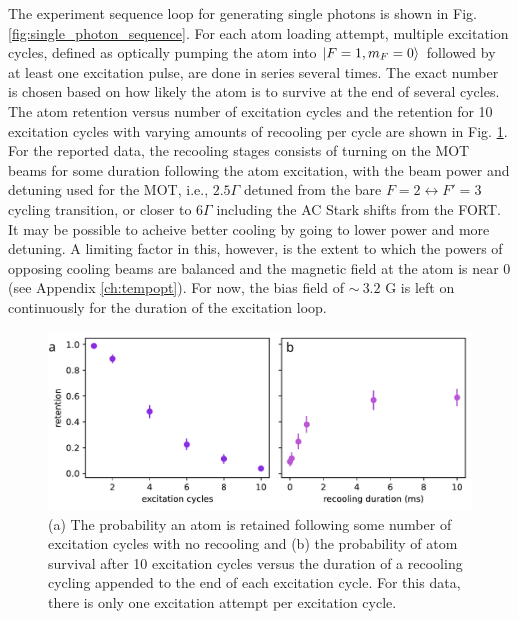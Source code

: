 The experiment sequence loop for generating single photons is shown in Fig. \ref{fig:single_photon_sequence}. For each atom loading attempt, multiple excitation cycles, defined as optically pumping the atom into $\ket{F=1,m_F=0}$ followed by at least one excitation pulse, are done in series several times. The exact number is chosen based on how likely the atom is to survive at the end of several cycles. The atom retention versus number of excitation cycles and the retention for 10 excitation cycles with varying amounts of recooling per cycle are shown in Fig. \ref{fig:sequence_survival_probability}. For the reported data, the recooling stages consists of turning on the MOT beams for some duration following the atom excitation, with the beam power and detuning used for the MOT, i.e., $2.5 \Gamma$ detuned from the bare $F=2\leftrightarrow F'=3$ cycling transition, or closer to $6 \Gamma$ including the AC Stark shifts from the FORT. It may be possible to acheive better cooling by going to lower power and more detuning. A limiting factor in this, however, is the extent to which the powers of opposing cooling beams are balanced and the magnetic field at the atom is near 0 (see Appendix \ref{ch:tempopt}). For now, the bias field of $\sim~3.2 $ G is left on continuously for the duration of the excitation loop.

\begin{figure}[!h]
    \centering
    \includegraphics[width=\textwidth]{Images/retention_vs_excitation_cycles_and_recooling.pdf}
    \caption{(a) The probability an atom is retained following some number of excitation cycles with no recooling and (b) the probability of atom survival after 10 excitation cycles versus the duration of a recooling cycling appended to the end of each excitation cycle. For this data, there is only one excitation attempt per excitation cycle.}
    \label{fig:sequence_survival_probability}
\end{figure}

